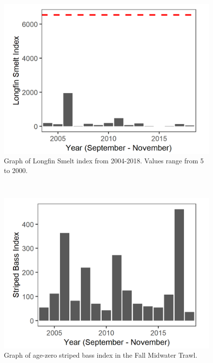\documentclass[
]{book}
\begin{document}
\begin{panel-grid}
\begin{columns-nocenter}
\begin{column800}
\begin{expand}
\begin{figure}
\includegraphics[width=15.25in]{figures/FMWT_LFS_2004} \caption{Graph of Longfin Smelt index from 2004-2018. Values range from 5 to 2000.}\label{fig:unnamed-chunk-140}
\end{figure}

\end{expand}

\end{column800}

\begin{column40}

~

\end{column40}

\begin{column800}

\begin{expand}

\begin{figure}
\includegraphics[width=15.25in]{figures/FMWT_SB0_2004} \caption{Graph of age-zero striped bass index in the Fall Midwater Trawl.}\label{fig:unnamed-chunk-141}
\end{figure}


\end{expand}
\end{column800}
\end{columns-nocenter}
\end{panel-grid}
\end{document}
